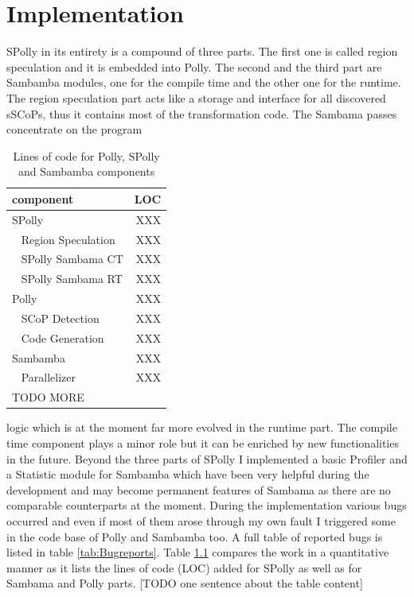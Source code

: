 
\chapter{Implementation} %
\label{Chapter4}

\orange
\begin{shaded}
SPolly in its entirety is a compound of three parts. The first one is called 
region speculation and it is embedded into Polly. The second and the third 
part are Sambamba modules, one for the compile time and the other one
for the runtime. The region speculation part acts like a storage and interface
for all discovered sSCoPs, thus it contains most of the transformation code.
The Sambama passes concentrate on the program 
\begin{table}
  \caption{Lines of code for Polly, SPolly and Sambamba components}
  \begin{center}
    \begin{tabular}{ l r }
     component     & LOC  \\
      \hline
      SPolly     & XXX \\
      ~ Region Speculation     & XXX \\
      ~ SPolly Sambama CT  & XXX \\
      ~ SPolly Sambama RT  & XXX \\
      Polly     & XXX \\
      ~ SCoP Detection     & XXX \\
      ~ Code Generation    & XXX \\
      Sambamba     & XXX \\
      ~ Parallelizer     & XXX \\
               TODO MORE & \\
    \end{tabular}
  \end{center}
  \label{tab:LinesOfCode}
\end{table}
logic which is at the moment 
far more evolved in the runtime part. The compile time component plays a minor
role but it can be enriched by new functionalities in the future. Beyond the 
three parts of SPolly I implemented a basic Profiler and a Statistic module for
Sambamba which have been very helpful during the development and may become 
permanent features of Sambama as there are no comparable counterparts at the 
moment. During the implementation various bugs occurred and even if most of them
arose through my own fault I triggered some in the code base of Polly and 
Sambamba too. A full table of reported bugs is listed in table 
\ref{tab:Bugreports}. Table \ref{tab:LinesOfCode} compares the work in a
quantitative manner as it lists the lines of code (LOC) added for SPolly as well
as for Sambama and Polly parts.
[TODO one sentence about the table content]


\end{shaded}
